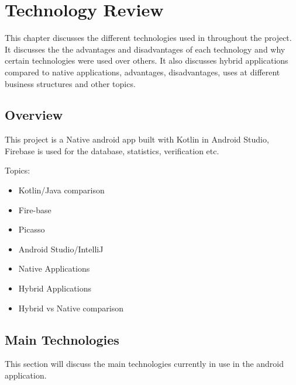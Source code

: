 \chapter{Technology Review}
This chapter discusses the different technologies used in throughout the
project. It discusses the the advantages and disadvantages of each technology 
and why certain technologies were used over others. It also discusses hybrid applications compared to native applications, advantages, disadvantages, uses at different business structures and other topics.

\section{Overview}
This project is a Native android app built with Kotlin in Android Studio, Firebase is used for the database, statistics, verification etc.

Topics:
\begin{itemize}
    \item Kotlin/Java comparison
    \item Fire-base
    \item Picasso
    \item Android Studio/IntelliJ
    \item Native Applications
    \item Hybrid Applications
    \item Hybrid vs Native comparison 
\end{itemize}
\newpage

\section{Main Technologies}
This section will discuss the main technologies currently in use in the android application.
